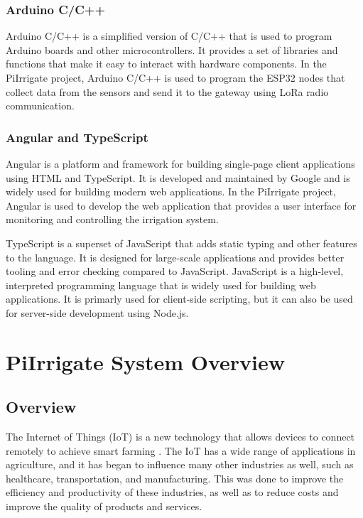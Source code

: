 \subsection{Arduino C/C++}
Arduino C/C++ is a simplified version of C/C++ that is used to program Arduino 
boards and other microcontrollers.
It provides a set of libraries and functions that make it easy to interact with hardware components.
In the PiIrrigate project, Arduino C/C++ is used to program the ESP32 nodes that collect data from the sensors
and send it to the gateway using LoRa radio communication.

\subsection{Angular and TypeScript}
Angular is a platform and framework for building single-page client applications using HTML and TypeScript.
It is developed and maintained by Google and is widely used for building modern web applications.
In the PiIrrigate project, Angular is used to develop the web application that provides a user interface for
monitoring and controlling the irrigation system.

TypeScript is a superset of JavaScript that adds static typing and other features to the language.
It is designed for large-scale applications and provides better tooling and error checking compared to JavaScript.
JavaScript is a high-level, interpreted programming language that is widely used for building web applications.
It is primarly used for client-side scripting, but it can also be used for
 server-side development using Node.js.

\chapter{PiIrrigate System Overview}\label{section:overview}

\section{Overview}
The Internet of Things (IoT) is a new technology that allows devices to connect remotely to achieve smart
farming \cite{agriculture12101745}. The IoT has a wide range of applications in agriculture, and it has 
began to influence many other industries as well, such as healthcare, transportation, and manufacturing. 
This was done to improve the efficiency and productivity of these industries, 
as well as to reduce costs and improve the quality of products and services\cite{s19081833}.

